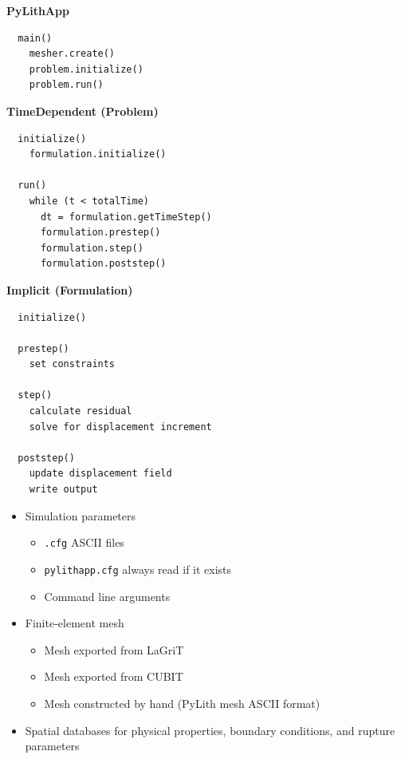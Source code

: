 \documentclass[pdftex,cig,slideColor]{pp4slides}
\begin{document}
  \summary{}
 {\small
  \begin{minipage}[t]{3.75in}
    {\bf PyLithApp}\\[8pt]
    \begin{verbatim}
  main()
    mesher.create()
    problem.initialize()
    problem.run()
    \end{verbatim}
    \vspace*{20pt}
    {\bf TimeDependent (Problem)}\\[8pt]
    \begin{verbatim}
  initialize()
    formulation.initialize()

  run()
    while (t < totalTime)
      dt = formulation.getTimeStep()
      formulation.prestep()
      formulation.step()
      formulation.poststep()
\end{verbatim}
  \end{minipage}
  \hfill
  \begin{minipage}[t]{3.75in}
    {\bf Implicit (Formulation)}\\[8pt]
    \begin{verbatim}
  initialize()

  prestep()
    set constraints

  step()
    calculate residual
    solve for displacement increment

  poststep()
    update displacement field
    write output
\end{verbatim}
  \end{minipage}
}


  \begin{itemize}
  \item Simulation parameters
    \begin{itemize}
    \item {\tt .cfg} ASCII files
    \item {\tt pylithapp.cfg} always read if it exists
    \item Command line arguments
    \end{itemize}
  \item Finite-element mesh
    \begin{itemize}
    \item Mesh exported from LaGriT
    \item Mesh exported from CUBIT
    \item Mesh constructed by hand (PyLith mesh ASCII format)
    \end{itemize}
  \item Spatial databases for physical properties, boundary
    conditions, and rupture parameters
  \end{itemize}
\end{document}
